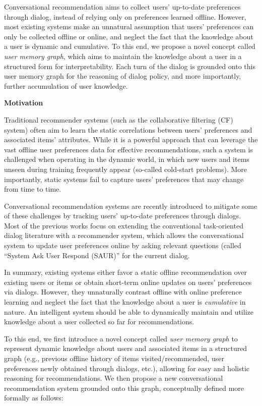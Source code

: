Conversational recommendation aims to collect users' up-to-date preferences through dialog, instead of relying only on preferences learned offline.
However, most existing systems make an unnatural assumption that users' preferences can only be collected offline or online, and neglect the fact that the knowledge about a user is dynamic and cumulative.
To this end, we propose a novel concept called \textit{user memory graph}, which aims to maintain the knowledge about a user in a structured form for interpretability.
Each turn of the dialog is grounded onto this user memory graph for the reasoning of dialog policy, and more importantly, further accumulation of user knowledge.

\textbf{Motivation}

Traditional recommender systems (such as the collaborative filtering (CF) system) often aim to learn the static correlations between users' preferences and associated items' attributes.
While it is a powerful approach that can leverage the vast offline user preferences data for effective recommendations, such a system is challenged when operating in the dynamic world, in which new users and items unseen during training frequently appear (so-called cold-start problems).
More importantly, static systems fail to capture users' preferences that may change from time to time.

Conversational recommendation systems \cite{li2018towards} are recently introduced to mitigate some of these challenges by tracking users' up-to-date preferences through dialogs.
Most of the previous works focus on extending the conventional task-oriented dialog literature with a recommender system, which allows the conversational system to update user preferences online by asking relevant questions (called ``System Ask User Respond (SAUR)'' for the current dialog.

In summary, existing systems either favor a static offline recommendation over existing users or items or obtain short-term online updates on users' preferences via dialogs.
However, they unnaturally contrast offline with online preference learning and neglect the fact that the knowledge about a user is \textit{cumulative} in nature.
An intelligent system should be able to dynamically maintain and utilize knowledge about a user collected so far for recommendations.

To this end, we first introduce a novel concept called \textit{user memory graph} to represent dynamic knowledge about users and associated items in a structured graph (e.g., previous offline history of items visited/recommended, user preferences newly obtained through dialogs, etc.), allowing for easy and holistic reasoning for recommendations.
We then propose a new conversational recommendation system grounded onto this graph, conceptually defined more formally as follows:

